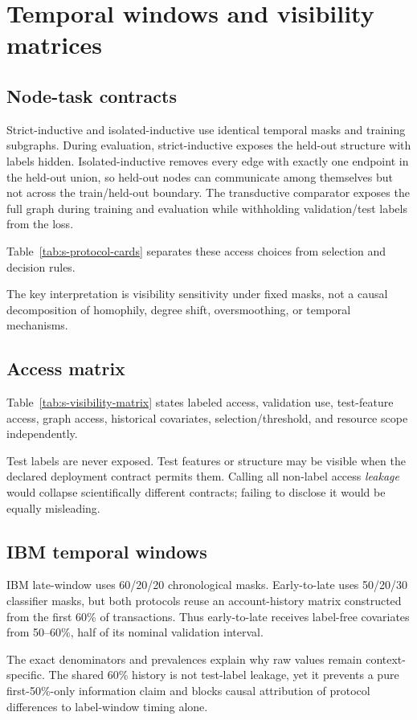 \section{Temporal windows and visibility matrices}
\label{sec:s-visibility}

\subsection{Node-task contracts}

Strict-inductive and isolated-inductive use identical temporal masks and training subgraphs. During evaluation, strict-inductive exposes the held-out structure with labels hidden. Isolated-inductive removes every edge with exactly one endpoint in the held-out union, so held-out nodes can communicate among themselves but not across the train/held-out boundary. The transductive comparator exposes the full graph during training and evaluation while withholding validation/test labels from the loss.

Table~\ref{tab:s-protocol-cards} separates these access choices from selection and decision rules.



The key interpretation is visibility sensitivity under fixed masks, not a causal decomposition of homophily, degree shift, oversmoothing, or temporal mechanisms.

\subsection{Access matrix}

Table~\ref{tab:s-visibility-matrix} states labeled access, validation use, test-feature access, graph access, historical covariates, selection/threshold, and resource scope independently.



Test labels are never exposed. Test features or structure may be visible when the declared deployment contract permits them. Calling all non-label access \emph{leakage} would collapse scientifically different contracts; failing to disclose it would be equally misleading.

\subsection{IBM temporal windows}

IBM late-window uses 60/20/20 chronological masks. Early-to-late uses 50/20/30 classifier masks, but both protocols reuse an account-history matrix constructed from the first 60\% of transactions. Thus early-to-late receives label-free covariates from 50--60\%, half of its nominal validation interval.



The exact denominators and prevalences explain why raw values remain context-specific. The shared 60\% history is not test-label leakage, yet it prevents a pure first-50\%-only information claim and blocks causal attribution of protocol differences to label-window timing alone.
